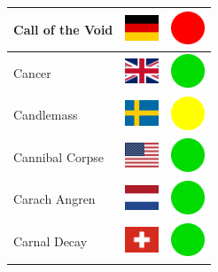 \documentclass[12pt, a4paper, twoside]{report}
\begin{document}
\begin{center}
\begin{longtable}{|p{5cm}|p{2cm}|p{2cm}|}
 Call of the Void                                           & \includegraphics[width=1cm]{../4x3/de} &   \includegraphics[width=1cm]{../likes/n} \\ \hline
 Cancer                                                     & \includegraphics[width=1cm]{../4x3/gb} &   \includegraphics[width=1cm]{../likes/y} \\ \hline
 Candlemass                                                 & \includegraphics[width=1cm]{../4x3/se} &   \includegraphics[width=1cm]{../likes/m} \\ \hline
 Cannibal Corpse                                            & \includegraphics[width=1cm]{../4x3/us} &   \includegraphics[width=1cm]{../likes/y} \\ \hline
 Carach Angren                                              & \includegraphics[width=1cm]{../4x3/nl} &   \includegraphics[width=1cm]{../likes/y} \\ \hline
 Carnal Decay                                               & \includegraphics[width=1cm]{../4x3/ch} &   \includegraphics[width=1cm]{../likes/y} \\ \hline

\end{longtable}
\end{center}
\end{document}
